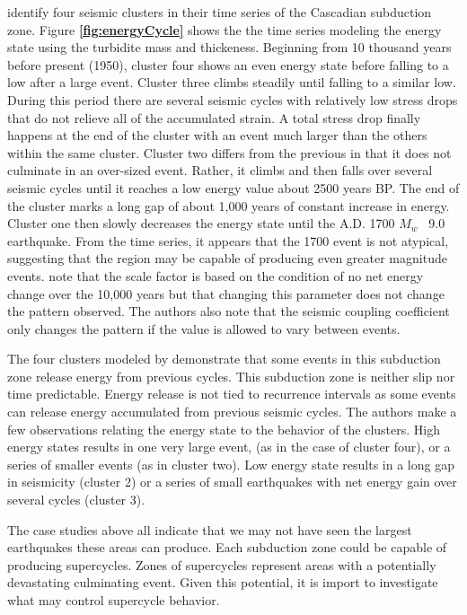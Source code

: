 \documentclass[]{proposalnsf}
\begin{document}
 \citet{Goldfinger2013} identify four seismic clusters in their time series of the Cascadian subduction zone. Figure {\bf \ref{fig:energyCycle}} shows the the time series modeling the energy state using the turbidite mass and thickeness. Beginning from 10 thousand years before present (1950), cluster four shows an even energy state before falling to a low after a large event. Cluster three climbs steadily until falling to a similar low. During this period there are several seismic cycles with relatively low stress drops that do not relieve all of the accumulated strain. A total stress drop finally happens at the end of the cluster with an event much larger than the others within the same cluster. Cluster two differs from the previous in that it does not culminate in an over-sized event. Rather, it climbs and then falls over several seismic cycles until it reaches a low energy value about 2500 years BP. The end of the cluster marks a long gap of about 1,000 years of constant increase in energy. Cluster one then slowly decreases the energy state until the A.D. 1700 $M_w$ ~9.0 earthquake. From the time series, it appears that the 1700 event is not atypical, suggesting that the region may be capable of producing even greater magnitude events. \citet{Goldfinger2013} note that the scale factor is based on the condition of no net energy change over the 10,000 years but that changing this parameter does not change the pattern observed. The authors also note that the seismic coupling coefficient only changes the pattern if the value is allowed to vary between events. 

The four clusters modeled by \citet{Goldfinger2013} demonstrate that some events in this subduction zone release energy from previous cycles. This subduction zone is neither slip nor time predictable. Energy release is not tied to recurrence intervals as some events can release energy accumulated from previous seismic cycles. The authors make a few observations relating the energy state to the behavior of the clusters. High energy states results in one very large event, (as in the case of cluster four), or a series of smaller events (as in cluster two). Low energy state results in a long gap in seismicity (cluster 2) or a series of small earthquakes with net energy gain over several cycles (cluster 3). 

The case studies above all indicate that we may not have seen the largest earthquakes these areas can produce. Each subduction zone could be capable of producing supercycles. Zones of supercycles represent areas with a potentially devastating culminating event. Given this potential, it is import to investigate what may control supercycle behavior.
\end{document}
